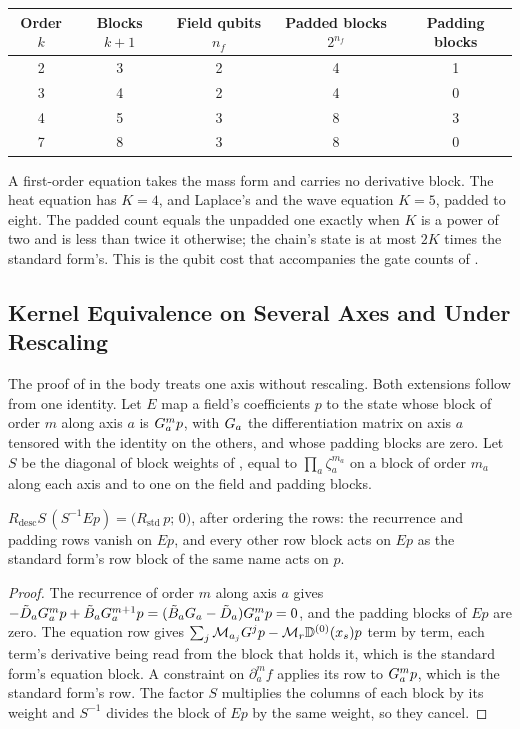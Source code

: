 \begin{center}
\begin{tabular}{ccccc}
\toprule
Order $k$ & Blocks $k+1$ & Field qubits $n_f$ & Padded blocks $2^{n_f}$ & Padding blocks \\
\midrule
2 & 3 & 2 & 4 & 1 \\
3 & 4 & 2 & 4 & 0 \\
4 & 5 & 3 & 8 & 3 \\
7 & 8 & 3 & 8 & 0 \\
\bottomrule
\end{tabular}
\end{center}

A first-order equation takes the mass form and carries no derivative block. The heat equation has $K=4$, and Laplace's and the wave equation $K=5$, padded to eight. The padded count equals the unpadded one exactly when $K$ is a power of two and is less than twice it otherwise; the chain's state is at most $2K$ times the standard form's. This is the qubit cost that accompanies the gate counts of .

\subsection{Kernel Equivalence on Several Axes and Under Rescaling}
\label{app:proof-kernel-equivalence}

The proof of  in the body treats one axis without rescaling. Both extensions follow from one identity. Let $E$ map a field's coefficients $p$ to the state whose block of order $m$ along axis $a$ is $G_a^mp$, with $G_a$ the differentiation matrix on axis $a$ tensored with the identity on the others, and whose padding blocks are zero. Let $S$ be the diagonal of block weights of , equal to $\prod_a\zeta_a^{m_a}$ on a block of order $m_a$ along each axis and to one on the field and padding blocks.

\begin{proposition}
\label{prop:substitution-identity}
$R_{\mathrm{desc}}S\,(S^{-1}Ep)=\bigl(R_{\mathrm{std}}\,p;\,0\bigr)$, after ordering the rows: the recurrence and padding rows vanish on $Ep$, and every other row block acts on $Ep$ as the standard form's row block of the same name acts on $p$.
\end{proposition}
\begin{proof}
The recurrence of order $m$ along axis $a$ gives $-\tilde{D}_aG_a^mp+\tilde{B}_aG_a^{m+1}p=(\tilde{B}_aG_a-\tilde{D}_a)G_a^mp=0$, and the padding blocks of $Ep$ are zero. The equation row gives $\sum_j\mathcal{M}_{a_j}G^jp-\mathcal{M}_r\mathbb{D}^{(0)}(x_s)p$ term by term, each term's derivative being read from the block that holds it, which is the standard form's equation block. A constraint on $\partial_a^mf$ applies its row to $G_a^mp$, which is the standard form's row. The factor $S$ multiplies the columns of each block by its weight and $S^{-1}$ divides the block of $Ep$ by the same weight, so they cancel.
\end{proof}

